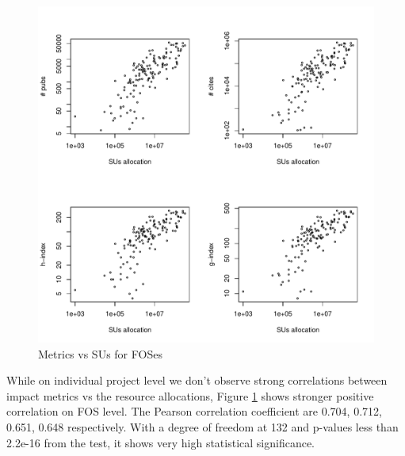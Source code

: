 \begin{figure}[htb]
  \centering
    \includegraphics[width=1.0\columnwidth]{images/03_metrics_vs_alloc_fos.pdf}
  \caption{Metrics vs SUs for FOSes}\label{F:metrics-vs-alloc-fos}
\end{figure}
While on individual project level we don't observe strong correlations between impact metrics vs the resource allocations, Figure \ref {F:metrics-vs-alloc-fos} shows stronger positive correlation on FOS level. The Pearson correlation coefficient are 0.704, 0.712, 0.651, 0.648 respectively. With a degree of freedom at 132 and p-values less than 2.2e-16 from the test, it shows very high statistical significance. 


